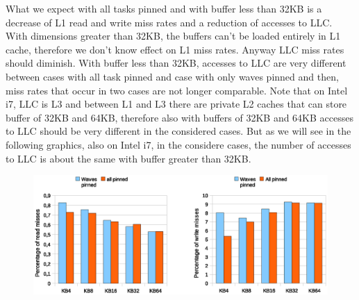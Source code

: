 \begin{table}[tbp]
\centering%
\hspace{4em}
\label{tab:assignment}
\caption{CPUs assignment}
\end{table}

What we expect with all tasks pinned and with buffer less than 32KB is a decrease of L1 read and write miss rates and a reduction of accesses to LLC. 
With dimensions greater than 32KB, the buffers can't be loaded entirely in L1 cache, therefore we don't know effect on L1 miss rates. Anyway LLC miss 
rates should diminish. With buffer less than 32KB, accesses to LLC are very different between cases with all task pinned and case with only waves 
pinned and then, miss rates that occur in two cases are not longer comparable. Note that on Intel i7, LLC is L3 and between L1 and L3 there are private L2 
caches that can store buffer of 32KB and 64KB, therefore also with buffers of 32KB and 64KB accesses to LLC should be very different in the considered cases.
But as we will see in the following graphics, also on Intel i7, in the considere cases, the number of accesses to LLC is about the same with buffer greater 
than 32KB. 

\begin{figure}[htbp]
\centering
\includegraphics[width=\widefigure]{images/cpuaff/cpuaff_l1_load_store_Xeon.eps}
\caption{}
\label{fig:cpuaff_l1_load_store_xeon}
\end{figure}

